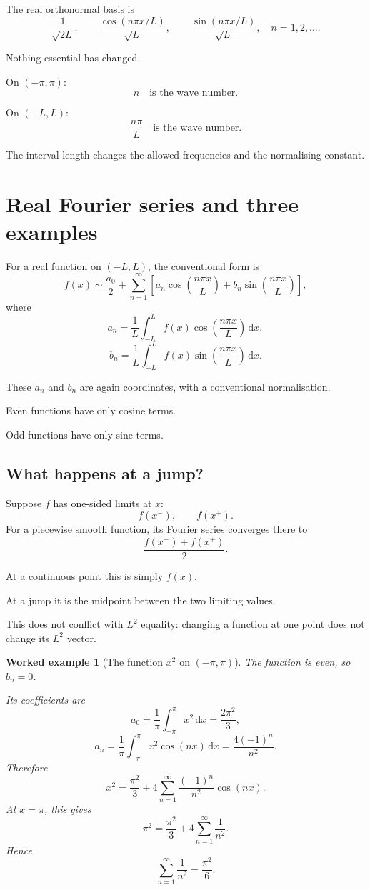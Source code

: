 \documentclass[11pt,a5paper,oneside,openany]{scrreprt}
\theoremstyle{notes}
\theoremstyle{definitions}
\newtheorem{example}[theorem]{Worked example}
\newcommand{\dd}{\,\mathrm{d}}
\begin{document}
The real orthonormal basis is
\[
 \boxed{
 \frac1{\sqrt{2L}},
 \qquad
 \frac{\cos(n\pi x/L)}{\sqrt L},
 \qquad
 \frac{\sin(n\pi x/L)}{\sqrt L},
 \quad n=1,2,\ldots .}
\]

\begin{bridge}
Nothing essential has changed.

On $(-\pi,\pi)$:
\[
 n\quad\text{is the wave number}.
\]

On $(-L,L)$:
\[
 \frac{n\pi}{L}\quad\text{is the wave number}.
\]

The interval length changes the allowed frequencies and the normalising
constant.
\end{bridge}

\section{Real Fourier series and three examples}

For a real function on $(-L,L)$, the conventional form is
\[
 f(x)\sim
 \frac{a_0}{2}
 +\sum_{n=1}^{\infty}
 \left[
 a_n\cos\!\left(\frac{n\pi x}{L}\right)
 +b_n\sin\!\left(\frac{n\pi x}{L}\right)
 \right],
\]
where
\[
 a_n=\frac1L\int_{-L}^{L}
 f(x)\cos\!\left(\frac{n\pi x}{L}\right)\dd x,
\]
\[
 b_n=\frac1L\int_{-L}^{L}
 f(x)\sin\!\left(\frac{n\pi x}{L}\right)\dd x.
\]

These $a_n$ and $b_n$ are again coordinates, with a conventional
normalisation.

Even functions have only cosine terms.

Odd functions have only sine terms.

\subsection*{What happens at a jump?}

Suppose $f$ has one-sided limits at $x$:
\[
 f(x^-),
 \qquad
 f(x^+).
\]
For a piecewise smooth function, its Fourier series converges there to
\[
 \boxed{\frac{f(x^-)+f(x^+)}2.}
\]

At a continuous point this is simply $f(x)$.

At a jump it is the midpoint between the two limiting values.

This does not conflict with $L^2$ equality: changing a function at one point
does not change its $L^2$ vector.

\begin{example}[The function $x^2$ on $(-\pi,\pi)$]
The function is even, so $b_n=0$.

Its coefficients are
\[
 a_0=\frac1\pi\int_{-\pi}^{\pi}x^2\dd x
 =\frac{2\pi^2}{3},
\]
\[
 a_n=\frac1\pi\int_{-\pi}^{\pi}x^2\cos(nx)\dd x
 =\frac{4(-1)^n}{n^2}.
\]
Therefore
\[
 \boxed{
 x^2=\frac{\pi^2}{3}
 +4\sum_{n=1}^{\infty}
 \frac{(-1)^n}{n^2}\cos(nx).}
\]
At $x=\pi$, this gives
\[
 \pi^2=\frac{\pi^2}{3}
 +4\sum_{n=1}^{\infty}\frac1{n^2}.
\]
Hence
\[
 \sum_{n=1}^{\infty}\frac1{n^2}
 =\frac{\pi^2}{6}.
\]
\end{example}
\end{document}
